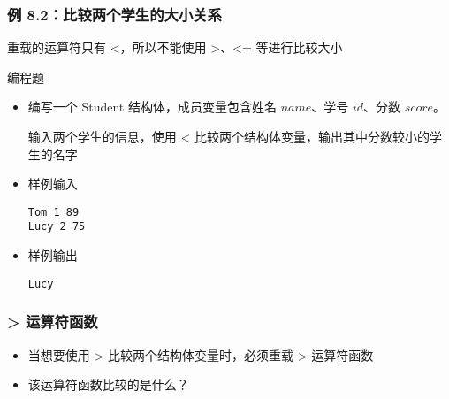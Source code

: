 \begin{frame}[fragile]
    \frametitle{例 8.2：比较两个学生的大小关系}

     {
         {}
         {}
         {
            

            \begin{itemize}
                 {\item 重载的运算符只有 <，所以不能使用 >、<= 等进行比较大小}
            \end{itemize}
        }
    } {
        \begin{exampleblock}{编程题}
            \begin{itemize}
                \item 编写一个 Student 结构体，成员变量包含姓名 $name$、学号 $id$、分数 $score$。

                        输入两个学生的信息，使用 < 比较两个结构体变量，输出其中分数较小的学生的名字   

                \item 样例输入
    
                    \lstinline|Tom 1 89|\\
                    \lstinline|Lucy 2 75|    

                \item 样例输出
                
                    \lstinline|Lucy|
    
            \end{itemize}
        \end{exampleblock}
    }

\end{frame}

\begin{frame}[fragile]
    \frametitle{> 运算符函数}

    \begin{itemize}
        \item 当想要使用 > 比较两个结构体变量时，必须重载 > 运算符函数
        
        

        \item<2> 该运算符函数比较的是什么？
        
    \end{itemize}

\end{frame}

